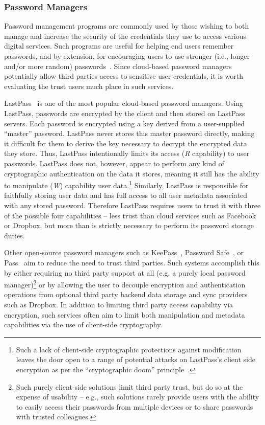 \subsubsection{Password Managers}

Password management programs are commonly used by those wishing to
both manage and increase the security of the credentials they use to
access various digital services. Such programs are useful for helping
end users remember passwords, and by extension, for encouraging users
to use stronger (i.e., longer and/or more random)
passwords~\cite{brodkin-passman, krebs-passwords,
  schneier-passwords}. Since cloud-based password managers potentially
allow third parties access to sensitive user credentials, it is worth
evaluating the trust users much place in such services.

LastPass~\cite{lastpass} is one of the most popular cloud-based
password managers. Using LastPass, passwords are encrypted by the
client and then stored on LastPass servers. Each password is encrypted
using a key derived from a user-supplied ``master'' password. LastPass
never stores this master password directly, making it difficult for
them to derive the key necessary to decrypt the encrypted data they
store. Thus, LastPass intentionally limits its access (\emph{R}
capability) to user passwords. LastPass does not, however, appear to
perform any kind of cryptographic authentication on the data it
stores, meaning it still has the ability to manipulate (\emph{W})
capability user data.\footnote{Such a lack of client-side
  cryptographic protections against modification leaves the door open
  to a range of potential attacks on LastPass's client side encryption
  as per the ``cryptographic doom''
  principle~\cite{marlinspike-doom}.} Similarly, LastPass is
responsible for faithfully storing user data and has full access to
all user metadata associated with any stored password. Therefore
LastPass requires users to trust it with three of the possible four
capabilities -- less trust than cloud services such as Facebook or
Dropbox, but more than is strictly necessary to perform its password
storage duties.

Other open-source password managers such as KeePass~\cite{keepass},
Password Safe~\cite{passwordsafe}, or Pass~\cite{pass} aim to reduce
the need to trust third parties. Such systems accomplish this by
either requiring no third party support at all (e.g. a purely local
password manager)\footnote{Such purely client-side solutions limit
  third party trust, but do so at the expense of usability -- e.g.,
  such solutions rarely provide users with the ability to easily
  access their passwords from multiple devices or to share passwords
  with trusted colleagues.} or by allowing the user to decouple
encryption and authentication operations from optional third party
backend data storage and sync providers such as Dropbox. In addition
to limiting third party access capability via encryption, such
services often aim to limit both manipulation and metadata
capabilities via the use of client-side cryptography.

